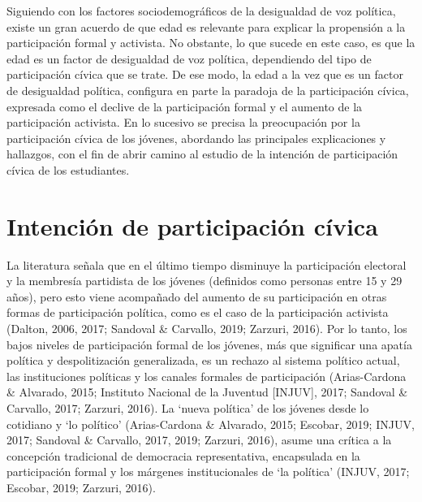 \documentclass[12pt,twoside]{templates/facsothesis}
\begin{document}
Siguiendo con los factores sociodemográficos de la desigualdad de voz política, existe un gran acuerdo de que edad es relevante para explicar la propensión a la participación formal y activista. No obstante, lo que sucede en este caso, es que la edad es un factor de desigualdad de voz política, dependiendo del tipo de participación cívica que se trate. De ese modo, la edad a la vez que es un factor de desigualdad política, configura en parte la paradoja de la participación cívica, expresada como el declive de la participación formal y el aumento de la participación activista. En lo sucesivo se precisa la preocupación por la participación cívica de los jóvenes, abordando las principales explicaciones y hallazgos, con el fin de abrir camino al estudio de la intención de participación cívica de los estudiantes.

\hypertarget{intenciuxf3n-de-participaciuxf3n-cuxedvica}{%
\section{Intención de participación cívica}\label{intenciuxf3n-de-participaciuxf3n-cuxedvica}}

La literatura señala que en el último tiempo disminuye la participación electoral y la membresía partidista de los jóvenes (definidos como personas entre 15 y 29 años), pero esto viene acompañado del aumento de su participación en otras formas de participación política, como es el caso de la participación activista (Dalton, 2006, 2017; Sandoval \& Carvallo, 2019; Zarzuri, 2016). Por lo tanto, los bajos niveles de participación formal de los jóvenes, más que significar una apatía política y despolitización generalizada, es un rechazo al sistema político actual, las instituciones políticas y los canales formales de participación (Arias-Cardona \& Alvarado, 2015; Instituto Nacional de la Juventud {[}INJUV{]}, 2017; Sandoval \& Carvallo, 2017; Zarzuri, 2016). La `nueva política' de los jóvenes desde lo cotidiano y `lo político' (Arias-Cardona \& Alvarado, 2015; Escobar, 2019; INJUV, 2017; Sandoval \& Carvallo, 2017, 2019; Zarzuri, 2016), asume una crítica a la concepción tradicional de democracia representativa, encapsulada en la participación formal y los márgenes institucionales de `la política' (INJUV, 2017; Escobar, 2019; Zarzuri, 2016).
\end{document}
